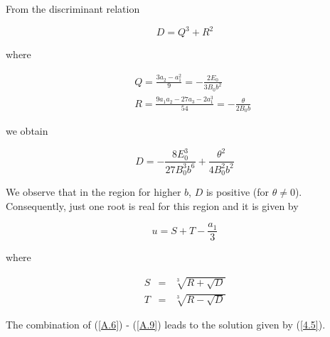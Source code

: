 \documentclass[a4paper,twocolumn,prd,superscriptaddress,nofootinbib,showpacs]
{revtex4}
\begin{document}
\noindent
From the discriminant relation

\begin{equation}
D=Q^3+R^2
\label{A.4}
\end{equation}

\noindent
where

\begin{eqnarray}
&&Q=\frac{3a_2-a_1^2}{9}=-\frac{2E_0}{3B_0b^2}
\label{A.5}\\
&&R=\frac{9a_1a_2-27a_3-2a_1^3}{54}=-\frac{\theta}{2B_0b}
\label{A.6}
\end{eqnarray}

\noindent
we obtain

\begin{equation}
D=-\frac{8E_0^3}{27B_0^3b^6}+\frac{\theta^2}{4B_0^2b^2}
\label{A.7}
\end{equation}

We observe that in the region for higher $b$, $D$ is positive (for
$\theta\neq0$). Consequently, just one root is real for this region
and it
is given by

\begin{equation}
u=S+T-\frac{a_1}{3}
\label{A.8}
\end{equation}

\noindent
where

\begin{eqnarray}
S&=&\sqrt[3]{R+\sqrt D}
\nonumber\\
T&=&\sqrt[3]{R-\sqrt D}
\label{A.9}
\end{eqnarray}

\noindent
The combination of (\ref{A.6}) - (\ref{A.9}) leads to the solution
given by (\ref{4.5}).
\end{document}
